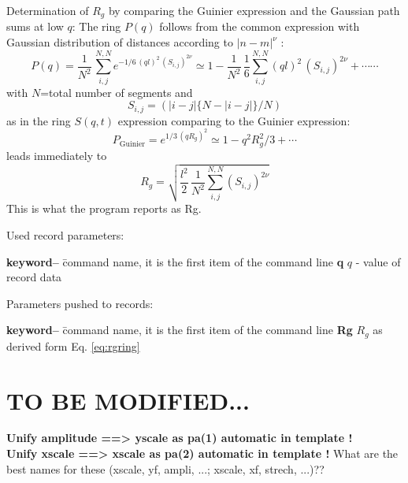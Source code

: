\documentclass[11pt,fleqn]{book} %
\newcommand{\linespace}{\vspace{4ex}}
\begin{document}
\begin{exercise}
Determination of $R_g$ by comparing the Guinier expression and the Gaussian path sums at low $q$:
The ring $P(q)$ follows from the common expression with Gaussian distribution of 
distances according to $|n-m|^\nu$ :
\begin{equation}
P(q) = \frac{1}{N^2} \, \sum_{i,j}^{N,N} e^{-1/6 \, (q l)^2 \, (S_{i,j})^{2\nu}}
\simeq 1 - \frac{1}{N^2} \, \frac{1}{6} 
\sum_{i,j}^{N,N} {(q l)^2 \, (S_{i,j})^{2\nu}}
+ \cdots \cdots
\end{equation}
with $N$=total number of segments and
\begin{equation}
  S_{i,j} = \left ( |i-j| \{ N-|i-j|\}/N \right )
\end{equation}
as in the ring $S(q,t)$ expression comparing to the Guinier expression:
\begin{equation}
P_\mathrm{Guinier} = e^{1/3 \, (q R_g)^2}
\simeq 
1 - q^2 R_g^2 /3 + \cdots
\end{equation}
leads immediately to
\begin{equation}
\label{eq:rgring}
R_g = \sqrt{\frac{l^2}{2} \, \frac{1}{N^2}\sum_{i,j}^{N,N} (S_{i,j})^{2 \nu}}
\end{equation}
This is what the program reports as Rg.
\end{exercise}

\linespace
Used record parameters: 
\begin{tabbing}
\textbf{keyword--}  \= command name, it is the first item of the command line                    \kill
\textbf{q   } \>   ${q}$ - value of record data         \\         
\end{tabbing}

\linespace
Parameters pushed to records:
\begin{tabbing}
\textbf{keyword--}  \= command name, it is the first item of the command line                    \kill
\textbf{Rg  } \>   ${R_g}$ as derived form Eq. \ref{eq:rgring}        \\         
\end{tabbing}

\linespace

\section{TO BE MODIFIED...}
\label{sec:mod}

\color{green}
{\bf Unify amplitude ==> yscale as pa(1) automatic in template !} \\
{\bf Unify xscale    ==> xscale as pa(2) automatic in template !}
What are the best names for these (xscale, yf, ampli, ...; xscale, xf, strech, ...)??
\color{black}
\end{document}
